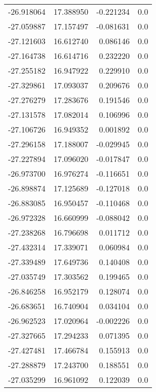 \begin{tabular}{rrrr}
      -26.918064 &        17.388950 &   -0.221234 &   0.0 \\
      -27.059887 &        17.157497 &   -0.081631 &   0.0 \\
      -27.121603 &        16.612740 &    0.086146 &   0.0 \\
      -27.164738 &        16.614716 &    0.232220 &   0.0 \\
      -27.255182 &        16.947922 &    0.229910 &   0.0 \\
      -27.329861 &        17.093037 &    0.209676 &   0.0 \\
      -27.276279 &        17.283676 &    0.191546 &   0.0 \\
      -27.131578 &        17.082014 &    0.106996 &   0.0 \\
      -27.106726 &        16.949352 &    0.001892 &   0.0 \\
      -27.296158 &        17.188007 &   -0.029945 &   0.0 \\
      -27.227894 &        17.096020 &   -0.017847 &   0.0 \\
      -26.973700 &        16.976274 &   -0.116651 &   0.0 \\
      -26.898874 &        17.125689 &   -0.127018 &   0.0 \\
      -26.883085 &        16.950457 &   -0.110468 &   0.0 \\
      -26.972328 &        16.660999 &   -0.088042 &   0.0 \\
      -27.238268 &        16.796698 &    0.011712 &   0.0 \\
      -27.432314 &        17.339071 &    0.060984 &   0.0 \\
      -27.339489 &        17.649736 &    0.140408 &   0.0 \\
      -27.035749 &        17.303562 &    0.199465 &   0.0 \\
      -26.846258 &        16.952179 &    0.128074 &   0.0 \\
      -26.683651 &        16.740904 &    0.034104 &   0.0 \\
      -26.962523 &        17.020964 &   -0.002226 &   0.0 \\
      -27.327665 &        17.294233 &    0.071395 &   0.0 \\
      -27.427481 &        17.466784 &    0.155913 &   0.0 \\
      -27.288879 &        17.243700 &    0.188551 &   0.0 \\
      -27.035299 &        16.961092 &    0.122039 &   0.0 \\

\end{tabular}
